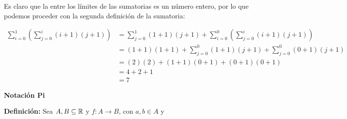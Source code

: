 Es claro que la  entre los límites de las sumatorias es un número entero, por lo que podemos proceder con la segunda definición de la sumatoria:

\begin{align*}
  \sum_{i=0}^{1} \left(\sum_{j=0}^{i}(i+1)(j+1)\right) &= \sum_{j=0}^{1} (1+1) (j+1) + \sum_{i=0}^{0} \left(\sum_{j=0}^{i}(i+1)(j+1)\right)\\
  &= (1+1)(1+1) + \sum_{j=0}^{0} (1+1) (j+1) + \sum_{j=0}^{0} (0+1)(j+1)\\
  &= (2)(2) + (1+1)(0+1) + (0+1)(0+1)\\
  &= 4 + 2 + 1\\
  &= 7
\end{align*}





\textbf{Notación Pi}

\textbf{Definición:} Sea $A,B\subseteq \mathbb{R}$ y $f: A\to B$, con $a,b\in A$ y 
